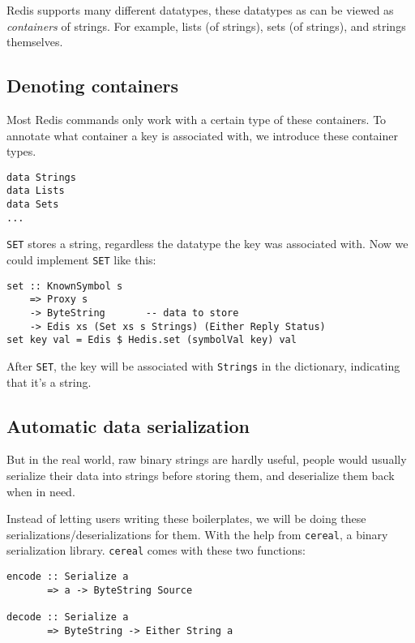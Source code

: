 \documentclass[pldi]{sigplanconf-pldi16}
\begin{document}
Redis supports many different datatypes, these datatypes as can be viewed as
\emph{containers} of strings. For example, lists (of strings),
sets (of strings), and strings themselves.

\subsection{Denoting containers}
Most Redis commands only work with a certain type of these containers. To
annotate what container a key is associated with, we introduce these container
types.

\begin{verbatim}
data Strings
data Lists
data Sets
...
\end{verbatim}

\texttt{SET} stores a string, regardless the datatype the key was
 associated with. Now we could implement \texttt{SET} like this:

\begin{verbatim}
set :: KnownSymbol s
    => Proxy s
    -> ByteString       -- data to store
    -> Edis xs (Set xs s Strings) (Either Reply Status)
set key val = Edis $ Hedis.set (symbolVal key) val
\end{verbatim}

After \texttt{SET}, the key will be associated with
\texttt{Strings} in the dictionary, indicating that it's a string.
%

\subsection{Automatic data serialization}
But in the real world, raw binary strings are hardly useful, people would
usually serialize their data into strings before storing them, and deserialize
them back when in need.

Instead of letting users writing these boilerplates, we will be doing these
serializations/deserializations for them. With the help from
\texttt{cereal}, a binary serialization library.
\texttt{cereal} comes with these two functions:

\begin{verbatim}
encode :: Serialize a
       => a -> ByteString Source

decode :: Serialize a
       => ByteString -> Either String a
\end{verbatim}
\end{document}
